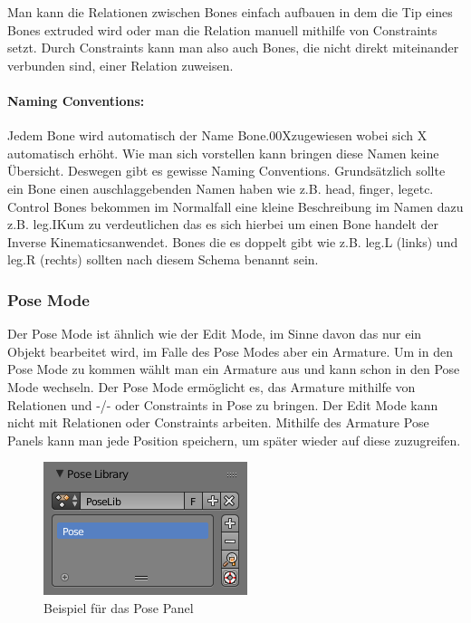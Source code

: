 Man kann die Relationen zwischen Bones einfach aufbauen in dem die Tip eines Bones extruded wird oder man die Relation manuell mithilfe von Constraints setzt.
Durch Constraints kann man also auch Bones, die nicht direkt miteinander verbunden sind, einer Relation zuweisen.

\paragraph{Naming Conventions:}
Jedem Bone wird automatisch der Name \dq Bone.00X\dq zugewiesen wobei sich X automatisch erhöht. Wie man sich vorstellen kann bringen diese Namen keine Übersicht.
Deswegen gibt es gewisse Naming Conventions. Grundsätzlich sollte ein Bone einen auschlaggebenden Namen haben wie z.B. \dq head\dq, \dq finger\dq, \dq leg\dq  etc.
Control Bones bekommen im Normalfall eine kleine Beschreibung im Namen dazu z.B. \dq leg.IK\dq um zu verdeutlichen das es sich hierbei um einen Bone handelt der \dq Inverse Kinematics\dq anwendet.
Bones die es doppelt gibt wie z.B. leg.L (links) und leg.R (rechts) sollten nach diesem Schema benannt sein.

\subsubsection{Pose Mode}
Der Pose Mode ist ähnlich wie der Edit Mode, im Sinne davon das nur ein Objekt bearbeitet wird, im Falle des Pose Modes aber ein Armature.
Um in den Pose Mode zu kommen wählt man ein Armature aus und kann schon in den Pose Mode wechseln.
Der Pose Mode ermöglicht es, das Armature mithilfe von Relationen und \ver-/- oder Constraints in Pose zu bringen. Der Edit Mode kann nicht mit Relationen oder Constraints arbeiten.
Mithilfe des Armature Pose Panels kann man jede Position speichern, um später wieder auf diese zuzugreifen.

\begin{figure}[H]
    \centering

    \includegraphics[width=.8\textwidth]{images/rigging_pose_panel.png}
    \caption{Beispiel für das Pose Panel}
\end{figure}


